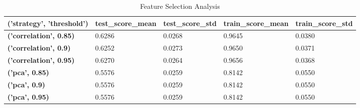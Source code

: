 \begin{table}
\caption{Feature Selection Analysis}
\label{tab:feature_selection_analysis}
\begin{tabular}{lllll}
\toprule
('strategy', 'threshold') & test\_score\_mean & test\_score\_std & train\_score\_mean & train\_score\_std \\
\midrule
\textbf{('correlation', 0.85)} & 0.6286 & 0.0268 & 0.9645 & 0.0380 \\
\textbf{('correlation', 0.9)} & 0.6252 & 0.0273 & 0.9650 & 0.0371 \\
\textbf{('correlation', 0.95)} & 0.6270 & 0.0264 & 0.9656 & 0.0368 \\
\textbf{('pca', 0.85)} & 0.5576 & 0.0259 & 0.8142 & 0.0550 \\
\textbf{('pca', 0.9)} & 0.5576 & 0.0259 & 0.8142 & 0.0550 \\
\textbf{('pca', 0.95)} & 0.5576 & 0.0259 & 0.8142 & 0.0550 \\
\bottomrule
\end{tabular}
\end{table}